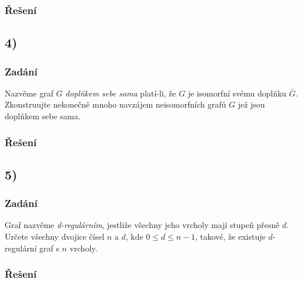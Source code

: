 \documentclass[../main.tex]{subfiles}
\begin{document}
\subsubsection*{Řešení}


\subsection*{4)}
\subsubsection*{Zadání}
Nazvěme graf $G$ \textit{doplňkem sebe sama} platí-li, že $G$ je isomorfní svému doplňku $\bar{G}$. 
Zkonstruujte nekonečně mnoho navzájem neisomorfních grafů $G$ jež jsou doplňkem sebe sama.
\subsubsection*{Řešení}



\subsection*{5)}
\subsubsection*{Zadání}
Graf nazvěme \textit{d-regulárním}, jestliže všechny jeho vrcholy mají stupeň přesně $d$. 
Určete všechny dvojice čísel $n$ a $d$, kde $0\leq d\leq n-1$, takové, že existuje $d$-regulární graf s $n$ vrcholy.
\subsubsection*{Řešení}
\end{document}
